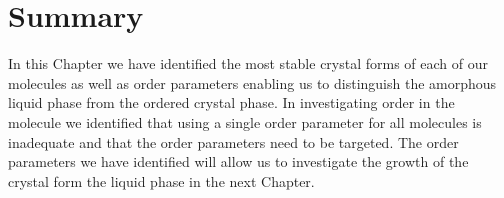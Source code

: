 \section{Summary}

In this Chapter we have identified the most stable crystal forms of each of our molecules as well as order parameters enabling us to distinguish the amorphous liquid phase from the ordered crystal phase. In investigating order in the \dcon molecule we identified that using a single order parameter for all molecules is inadequate and that the order parameters need to be targeted. The order parameters we have identified will allow us to investigate the growth of the crystal form the liquid phase in the next Chapter.
